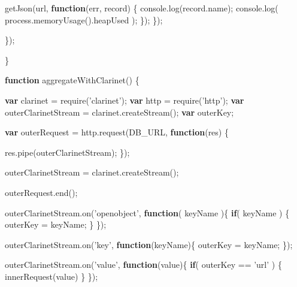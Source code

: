 \documentclass[]{article}
\newenvironment{Shaded}{}{}
\newcommand{\KeywordTok}[1]{\textcolor[rgb]{0.00,0.44,0.13}{\textbf{{#1}}}}
\newcommand{\StringTok}[1]{\textcolor[rgb]{0.25,0.44,0.63}{{#1}}}
\newcommand{\OtherTok}[1]{\textcolor[rgb]{0.00,0.44,0.13}{{#1}}}
\newcommand{\FunctionTok}[1]{\textcolor[rgb]{0.02,0.16,0.49}{{#1}}}
\newcommand{\NormalTok}[1]{{#1}}
\begin{document}
\begin{Shaded}
\begin{Highlighting}[]
         \FunctionTok{getJson}\NormalTok{(url, }\KeywordTok{function}\NormalTok{(err, record) \{}
            \OtherTok{console}\NormalTok{.}\FunctionTok{log}\NormalTok{(}\OtherTok{record}\NormalTok{.}\FunctionTok{name}\NormalTok{);}
            \OtherTok{console}\NormalTok{.}\FunctionTok{log}\NormalTok{( }\OtherTok{process}\NormalTok{.}\FunctionTok{memoryUsage}\NormalTok{().}\FunctionTok{heapUsed} \NormalTok{);}
         \NormalTok{\});}
      \NormalTok{\});}

   \NormalTok{\});   }

\NormalTok{\}}


\KeywordTok{function} \FunctionTok{aggregateWithClarinet}\NormalTok{() \{}

   \KeywordTok{var} \NormalTok{clarinet = }\FunctionTok{require}\NormalTok{(}\StringTok{'clarinet'}\NormalTok{);   }
   \KeywordTok{var} \NormalTok{http = }\FunctionTok{require}\NormalTok{(}\StringTok{'http'}\NormalTok{);}
   \KeywordTok{var} \NormalTok{outerClarinetStream = }\OtherTok{clarinet}\NormalTok{.}\FunctionTok{createStream}\NormalTok{();}
   \KeywordTok{var} \NormalTok{outerKey;}
   
   \KeywordTok{var} \NormalTok{outerRequest = }\OtherTok{http}\NormalTok{.}\FunctionTok{request}\NormalTok{(DB_URL, }\KeywordTok{function}\NormalTok{(res) \{}
                              
      \OtherTok{res}\NormalTok{.}\FunctionTok{pipe}\NormalTok{(outerClarinetStream);}
   \NormalTok{\});}
   
   \NormalTok{outerClarinetStream = }\OtherTok{clarinet}\NormalTok{.}\FunctionTok{createStream}\NormalTok{();}
      
   \OtherTok{outerRequest}\NormalTok{.}\FunctionTok{end}\NormalTok{();}
      
   \OtherTok{outerClarinetStream}\NormalTok{.}\FunctionTok{on}\NormalTok{(}\StringTok{'openobject'}\NormalTok{, }\KeywordTok{function}\NormalTok{( keyName )\{      }
      \KeywordTok{if}\NormalTok{( keyName ) \{}
         \NormalTok{outerKey = keyName;      }
      \NormalTok{\}}
   \NormalTok{\});}
   
   \OtherTok{outerClarinetStream}\NormalTok{.}\FunctionTok{on}\NormalTok{(}\StringTok{'key'}\NormalTok{, }\KeywordTok{function}\NormalTok{(keyName)\{}
      \NormalTok{outerKey = keyName;}
   \NormalTok{\});}
   
   \OtherTok{outerClarinetStream}\NormalTok{.}\FunctionTok{on}\NormalTok{(}\StringTok{'value'}\NormalTok{, }\KeywordTok{function}\NormalTok{(value)\{}
      \KeywordTok{if}\NormalTok{( outerKey == }\StringTok{'url'} \NormalTok{) \{}
         \FunctionTok{innerRequest}\NormalTok{(value)}
      \NormalTok{\}}
   \NormalTok{\});      }
   

\end{Highlighting}
\end{Shaded}
\end{document}
